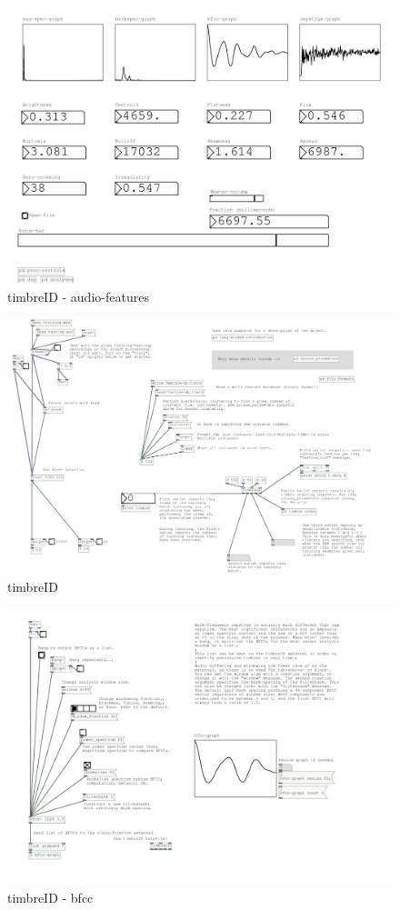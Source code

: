 \documentclass{ppgmus}
\begin{document}
\begin{figure}
\includegraphics[scale=.5]{audio-features}
\caption{timbreID - audio-features}
\label{audio-features}
\end{figure}

\begin{figure}
\includegraphics[scale=.5]{timbreid}
\caption{timbreID}
\label{timbreid}
\end{figure}

\begin{figure}
\includegraphics[scale=.6]{bfcc}
\caption{timbreID - bfcc}
\label{bfcc}
\end{figure}
\end{document}
